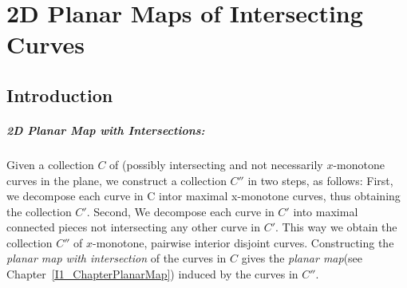 
%
%
%
%
%
%
%
%
%
%
%
\chapter{2D Planar Maps of Intersecting Curves} \label{I1_ChapterPmwx}

\section{Introduction}

\paragraph{2D Planar Map with Intersections:} 
  Given a collection $C$ of (possibly intersecting and not necessarily
  $x$-monotone curves in the plane, we construct a collection $C''$ in
  two steps, as follows: First, we decompose each curve in C intor
  maximal x-monotone curves, thus obtaining the collection
  $C'$. Second, We decompose each curve in $C'$ into maximal connected
  pieces not intersecting any other curve in $C'$.  This way we obtain
  the collection $C''$ of $x$-monotone, pairwise interior disjoint
  curves.  Constructing the {\it planar map with intersection} of the
  curves in $C$ gives the {\it planar map}(see
  Chapter~\ref{I1_ChapterPlanarMap}) induced by the curves in $C''$.

